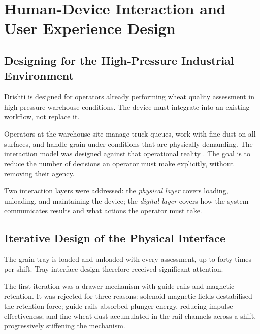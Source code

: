 
\chapter{Human-Device Interaction and User Experience Design}\doublespacing
\label{Chapter7}

\section{Designing for the High-Pressure Industrial \\Environment}

Drishti is designed for operators already performing wheat quality assessment in high-pressure warehouse conditions. The device must integrate into an existing workflow, not replace it.

Operators at the warehouse site manage truck queues, work with fine dust on all surfaces, and handle grain under conditions that are physically demanding. The interaction model was designed against that operational reality \cite{Stanton2005, Norman2013}. The goal is to reduce the number of decisions an operator must make explicitly, without removing their agency.

Two interaction layers were addressed: the \textit{physical layer} covers loading, unloading, and maintaining the device; the \textit{digital layer} covers how the system communicates results and what actions the operator must take.

\section{Iterative Design of the Physical Interface}

The grain tray is loaded and unloaded with every assessment, up to forty times per shift. Tray interface design therefore received significant attention.

The first iteration was a drawer mechanism with guide rails and magnetic retention. It was rejected for three reasons: solenoid magnetic fields destabilised the retention force; guide rails absorbed plunger energy, reducing impulse effectiveness; and fine wheat dust accumulated in the rail channels across a shift, progressively stiffening the mechanism.

